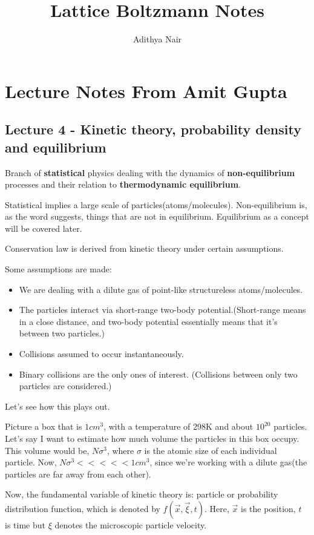 \documentclass{article}
\title{Lattice Boltzmann Notes}
\author{Adithya Nair}
\begin{document}
\maketitle

\section{Lecture Notes From Amit Gupta}
\subsection{Lecture 4 - Kinetic theory, probability density and equilibrium}
\begin{definition}
	Branch of \textbf{statistical} physics dealing with the dynamics of \textbf{non-equilibrium} processes and their relation to \textbf{thermodynamic equilibrium}.
\end{definition} Statistical implies a large scale of particles(atoms/molecules). Non-equilibrium is, as the word suggests, things that are not in equilibrium. Equilibrium as a concept will be covered later.

Conservation law is derived from kinetic theory under certain assumptions.


Some assumptions are made:
\begin{itemize}
	\item We are dealing with a dilute gas of point-like structureless atoms/molecules.
	\item The particles interact via short-range two-body potential.(Short-range means in a close distance, and two-body potential essentially means that it's between two particles.)
	\item Collisions assumed to occur instantaneously. 
	\item Binary collisions are the only ones of interest. (Collisions between only two particles are considered.)
\end{itemize}

Let's see how this plays out.

Picture a box that is $1cm^3$, with a temperature of 298K and about $10^{20}$ particles. Let's say I want to estimate how much volume the particles in this box occupy. This volume would be, $N \sigma^3$, where $\sigma$ is the atomic size of each individual particle. Now, $N\sigma^3 <<<<< 1 cm^3$, since we're working with a dilute gas(the particles are far away from each other). 

Now, the fundamental variable of kinetic theory is: particle or probability distribution function, which is denoted by $f(\vec{x}, \vec{\xi}, t)$. Here, $\vec{x}$ is the position, $t$ is time but $\xi$ denotes the microscopic particle velocity.
\end{document}
